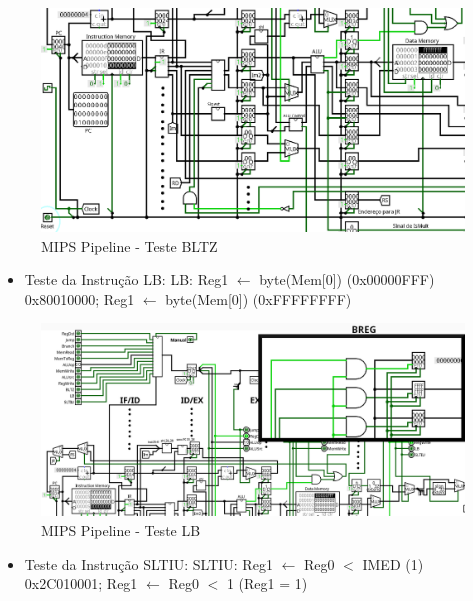 \documentclass{report}
\begin{document}
        \begin{figure}[h!]
            \centering
            \includegraphics[width=\linewidth]{images/prints/Pipeline/Teste BLTZ.png}
            \caption{\label{print:pipeline_test_BLTZ} MIPS Pipeline - Teste BLTZ}
        \end{figure}

        \begin{itemize}
            \item Teste da Instrução LB:
                \subitem LB: Reg1 $\leftarrow$ byte(Mem[0]) (0x00000FFF)
                \subitem 0x80010000; Reg1 $\leftarrow$ byte(Mem[0]) (0xFFFFFFFF)
        \end{itemize}
        
        \begin{figure}[h!]
            \centering
            \includegraphics[width=\linewidth]{images/prints/Pipeline/Teste LB.png}
            \caption{\label{print:pipeline_test_LB} MIPS Pipeline - Teste LB}
        \end{figure}

        \clearpage
        \begin{itemize}
            \item Teste da Instrução SLTIU:
                \subitem SLTIU: Reg1 $\leftarrow$ Reg0 $<$ IMED (1)
                \subitem 0x2C010001; Reg1 $\leftarrow$ Reg0 $<$ 1 (Reg1 = 1)
        \end{itemize}
        
\end{document}
